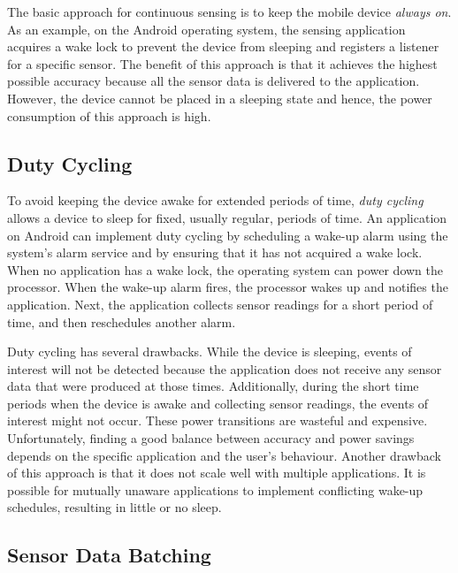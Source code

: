 The basic approach for continuous sensing is to keep the mobile device
\emph{always on}.  As an example, on the Android operating system, the
sensing application acquires a wake lock to prevent the device from
sleeping and registers a listener for a specific sensor.  The benefit
of this approach is that it achieves the highest possible accuracy
because all the sensor data is delivered to the application.  However,
the device cannot be placed in a sleeping state and hence, the power
consumption of this approach is high.

\subsection{Duty Cycling}

To avoid keeping the device awake for extended periods of time,
\emph{duty cycling} allows a device to sleep for fixed, usually
regular, periods of time.  An application on Android can implement
duty cycling by scheduling a wake-up alarm using the system's alarm
service and by ensuring that it has not acquired a wake lock.  When no
application has a wake lock, the operating system can power down the
processor.  When the wake-up alarm fires, the processor wakes up and
notifies the application.  Next, the application collects sensor
readings for a short period of time, and then reschedules another
alarm.

Duty cycling has several drawbacks.  While the device is sleeping,
events of interest will not be detected because the application does
not receive any sensor data that were produced at those times.
Additionally, during the short time periods when the device is awake
and collecting sensor readings, the events of interest might not
occur.  These power transitions are wasteful and expensive.
Unfortunately, finding a good balance between accuracy and power
savings depends on the specific application and the user's behaviour.
Another drawback of this approach is that it does not scale well with
multiple applications.  It is possible for mutually unaware
applications to implement conflicting wake-up schedules, resulting in
little or no sleep.

\subsection{Sensor Data Batching}

